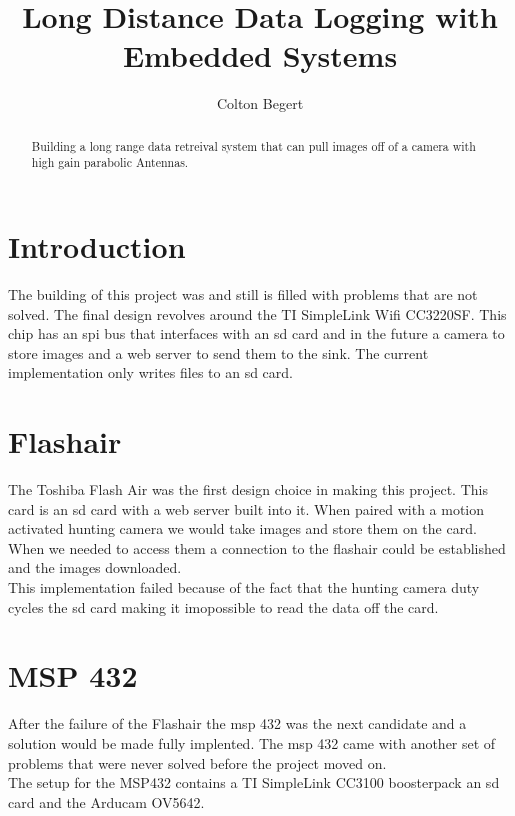 \documentclass{article}
\begin{document}
\title{Long Distance Data Logging with Embedded Systems}
\author{Colton Begert}

\maketitle

\begin{abstract}
    Building a long range data retreival system that can pull images off of a camera with high gain parabolic Antennas.


\end{abstract}

\section{Introduction}
The building of this project was and still is filled with problems that are not solved. The final design revolves around the TI SimpleLink Wifi CC3220SF. This chip has an spi bus that interfaces with an sd card and in the future a camera to store images and a web server to send them to the sink.
The current implementation only writes files to an sd card.

\section{Flashair}
 The Toshiba Flash Air was the first design choice in making this project. This card is an sd card with a web server built into it. When paired with a motion activated hunting camera we would take images and store them on the card. When we needed to access them a connection to the flashair could be established and the images downloaded.\\
 This implementation failed because of the fact that the hunting camera duty cycles the sd card making it imopossible to read the data off the card.

 \section{MSP 432}
 After the failure of the Flashair the msp 432 was the next candidate and a solution would be made fully implented.
 The msp 432 came with another set of problems that were never solved before the project moved on.\\

 The setup for the MSP432 contains a TI SimpleLink CC3100 boosterpack an sd card and the Arducam OV5642.
\end{document}
